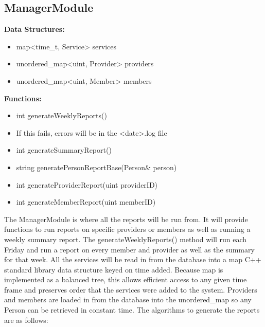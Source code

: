 \documentclass{article}
\begin{document}
\subsection{ManagerModule}
\textbf{Data Structures:}
\begin{itemize}
   \item map<time_t, Service>  services
   \item unordered_map<uint, Provider> providers
   \item unordered_map<uint, Member> members
\end{itemize}
\textbf{Functions:}
\begin{itemize}
   \item int generateWeeklyReports()
   \item If this fails, errors will be in the <date>.log file
   \item int generateSummaryReport()
   \item string generatePersonReportBase(Person\& person)
   \item int generateProviderReport(uint providerID)
   \item int generateMemberReport(uint memberID)
\end{itemize}
The ManagerModule is where all the reports will be run from. It will provide functions to run reports on specific providers or members as well as running a weekly summary report. The generateWeeklyReports() method will run each Friday and run a report on every member and provider as well as the summary for that week. All the services will be read in from the database into a map C++ standard library data structure keyed on time added. Because map is implemented as a balanced tree, this allows efficient access to any given time frame and preserves order that the services were added to the system. Providers and members are loaded in from the database into the unordered_map so any Person can be retrieved in constant time. The algorithms to generate the reports are as follows:
\end{document}
